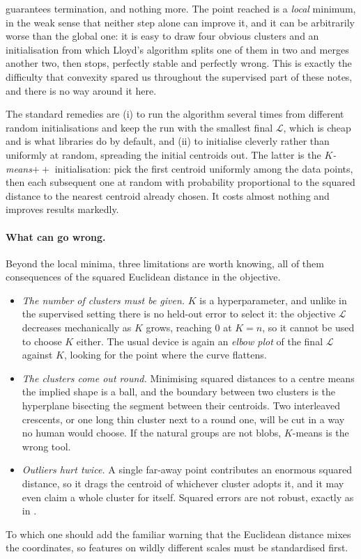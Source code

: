 \begin{remark}
 guarantees termination, and nothing more. The point reached
is a \emph{local} minimum, in the weak sense that neither step alone can improve it, and
it can be arbitrarily worse than the global one: it is easy to draw four obvious
clusters and an initialisation from which Lloyd's algorithm splits one of them in two
and merges another two, then stops, perfectly stable and perfectly wrong. This is
exactly the difficulty that convexity spared us throughout the supervised part of these
notes, and there is no way around it here.

The standard remedies are (i) to run the algorithm several times from different random
initialisations and keep the run with the smallest final $\mathcal{L}$, which is cheap
and is what libraries do by default, and (ii) to initialise cleverly rather than
uniformly at random, spreading the initial centroids out. The latter is the
\emph{$K$-means$++$} initialisation: pick the first centroid uniformly among the data
points, then each subsequent one at random with probability proportional to the squared
distance to the nearest centroid already chosen. It costs almost nothing and improves
results markedly.
\end{remark}

\paragraph{What can go wrong.}
Beyond the local minima, three limitations are worth knowing, all of them consequences
of the squared Euclidean distance in the objective.
\begin{itemize}
    \item \emph{The number of clusters must be given.} $K$ is a hyperparameter, and
    unlike in the supervised setting there is no held-out error to select it: the
    objective $\mathcal{L}$ decreases mechanically as $K$ grows, reaching $0$ at $K = n$,
    so it cannot be used to choose $K$ either. The usual device is again an
    \emph{elbow plot} of the final $\mathcal{L}$ against $K$, looking for the point
    where the curve flattens.
    \item \emph{The clusters come out round.} Minimising squared
    distances to a centre means the implied shape is a ball, and the boundary between
    two clusters is the hyperplane bisecting the segment between their centroids. Two
    interleaved crescents, or one long thin cluster next to a round one, will be cut in
    a way no human would choose. If the natural groups are not blobs, $K$-means is the
    wrong tool.
    \item \emph{Outliers hurt twice.} A single far-away point contributes an enormous
    squared distance, so it drags the centroid of whichever cluster adopts it, and it may
    even claim a whole cluster for itself. Squared errors are not robust, exactly as in
    .
\end{itemize}
To which one should add the familiar warning that the Euclidean distance mixes the
coordinates, so features on wildly different scales must be standardised first.

